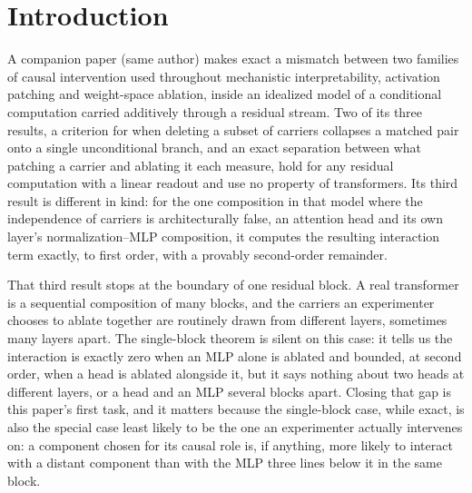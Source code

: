 \documentclass[11pt,a4paper]{article}
\begin{document}
\begin{abstract}
Third, on that same model, we search for and find an emergent circuit for
indirect object identification, a mechanism nobody trained the model to have
and nobody designed into it, using the original activation-patching method
for this task. We check the same three-way pattern, collapse, dissociation,
and a nonzero interaction, directly on it. The result is genuinely mixed: a
carrier shared across all five tested instances does emerge, collapse and
dissociation are present on most instances and absent or weak on at least one
each, and a nonzero interaction is measurable on three of the five, at layer
pairs that sit outside the same-block configuration the companion theorem was
proven for, so what they show bears on this paper's own open multi-layer
case rather than on that theorem directly.
\end{abstract}

\section{Introduction}
\label{sec:intro}

A companion paper (same author) makes exact a mismatch between two families
of causal intervention used throughout mechanistic interpretability,
activation patching and weight-space ablation, inside an idealized model of a
conditional computation carried additively through a residual stream. Two of
its three results, a criterion for when deleting a subset of carriers
collapses a matched pair onto a single unconditional branch, and an exact
separation between what patching a carrier and ablating it each measure, hold
for any residual computation with a linear readout and use no property of
transformers. Its third result is different in kind: for the one composition
in that model where the independence of carriers is architecturally false, an
attention head and its own layer's normalization--MLP composition, it
computes the resulting interaction term exactly, to first order, with a
provably second-order remainder.

That third result stops at the boundary of one residual block. A real
transformer is a sequential composition of many blocks, and the carriers an
experimenter chooses to ablate together are routinely drawn from different
layers, sometimes many layers apart. The single-block theorem is silent on
this case: it tells us the interaction is exactly zero when an MLP alone is
ablated and bounded, at second order, when a head is ablated alongside it,
but it says nothing about two heads at different layers, or a head and an MLP
several blocks apart. Closing that gap is this paper's first task, and it
matters because the single-block case, while exact, is also the special case
least likely to be the one an experimenter actually intervenes on: a
component chosen for its causal role is, if anything, more likely to interact
with a distant component than with the MLP three lines below it in the same
block.
\end{document}
